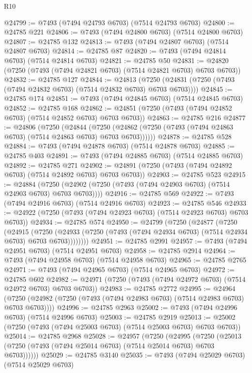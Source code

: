 \begin{lexlean}{R10}
\begin{coremodule}
@24799 := @7493 (@7494 @24793 @6703) (@7514 @24793 @6703)
@24800 := @24785 @221
@24806 := @7493 (@7494 @24800 @6703) (@7514 @24800 @6703)
@24807 := @24785 @132
@24813 := @7493 (@7494 @24807 @6703) (@7514 @24807 @6703)
@24814 := @24785 @87
@24820 := @7493 (@7494 @24814 @6703) (@7514 @24814 @6703)
@24821 := @24785 @50
@24831 := @24820 (@7250 (@7493 (@7494 @24821 @6703) (@7514 @24821 @6703) @6703 @6703))
@24832 := @24785 @127
@24844 := @24813
    (@7250 (@24831 (@7250 (@7493 (@7494 @24832 @6703) (@7514 @24832 @6703) @6703 @6703))))
@24845 := @24785 @174
@24851 := @7493 (@7494 @24845 @6703) (@7514 @24845 @6703)
@24852 := @24785 @168
@24862 := @24851 (@7250 (@7493 (@7494 @24852 @6703) (@7514 @24852 @6703) @6703 @6703))
@24863 := @24785 @216
@24877 := @24806
    (@7250
      (@24844
        (@7250 (@24862 (@7250 (@7493 (@7494 @24863 @6703) (@7514 @24863 @6703) @6703 @6703))))))
@24878 := @24785 @528
@24884 := @7493 (@7494 @24878 @6703) (@7514 @24878 @6703)
@24885 := @24785 @403
@24891 := @7493 (@7494 @24885 @6703) (@7514 @24885 @6703)
@24892 := @24785 @271
@24902 := @24891 (@7250 (@7493 (@7494 @24892 @6703) (@7514 @24892 @6703) @6703 @6703))
@24903 := @24785 @523
@24915 := @24884
    (@7250 (@24902 (@7250 (@7493 (@7494 @24903 @6703) (@7514 @24903 @6703) @6703 @6703))))
@24916 := @24785 @569
@24922 := @7493 (@7494 @24916 @6703) (@7514 @24916 @6703)
@24923 := @24785 @546
@24933 := @24922 (@7250 (@7493 (@7494 @24923 @6703) (@7514 @24923 @6703) @6703 @6703))
@24934 := @24785 @574
@24950 := @24799
    (@7250
      (@24877
        (@7250
          (@24915
            (@7250
              (@24933 (@7250 (@7493 (@7494 @24934 @6703) (@7514 @24934 @6703) @6703 @6703))))))))
@24951 := @24785 @2991
@24957 := @7493 (@7494 @24951 @6703) (@7514 @24951 @6703)
@24958 := @24785 @2914
@24964 := @7493 (@7494 @24958 @6703) (@7514 @24958 @6703)
@24965 := @24785 @2765
@24971 := @7493 (@7494 @24965 @6703) (@7514 @24965 @6703)
@24972 := @24785 @602
@24982 := @24971 (@7250 (@7493 (@7494 @24972 @6703) (@7514 @24972 @6703) @6703 @6703))
@24983 := @24785 @2772
@24995 := @24964
    (@7250 (@24982 (@7250 (@7493 (@7494 @24983 @6703) (@7514 @24983 @6703) @6703 @6703))))
@24996 := @24785 @2963
@25002 := @7493 (@7494 @24996 @6703) (@7514 @24996 @6703)
@25003 := @24785 @2919
@25013 := @25002 (@7250 (@7493 (@7494 @25003 @6703) (@7514 @25003 @6703) @6703 @6703))
@25014 := @24785 @2968
@25028 := @24957
    (@7250
      (@24995
        (@7250 (@25013 (@7250 (@7493 (@7494 @25014 @6703) (@7514 @25014 @6703) @6703 @6703))))))
@25029 := @24785 @3140
@25035 := @7493 (@7494 @25029 @6703) (@7514 @25029 @6703)

\end{coremodule}
\end{lexlean}
